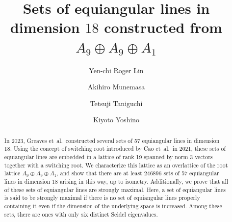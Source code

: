 \documentclass[reqno, 11pt]{amsart}
\author[]{Yen-chi Roger Lin}
\author[]{Akihiro Munemasa}
\author[]{Tetsuji Taniguchi}
\author[]{Kiyoto Yoshino}
\title[Sets of equiangular lines in dimension $18$]{Sets of equiangular lines in dimension $18$ constructed from $A_9 \oplus A_9 \oplus A_1$}
\numberwithin{equation}{section}
\theoremstyle{definition}
\begin{document}
\begin{abstract}
	In 2023, Greaves et~al.\ constructed several sets of 57 equiangular lines in dimension 18.
	Using the concept of switching root introduced by Cao et~al.\ in 2021, these sets of equiangular lines are embedded in a lattice of rank 19 spanned by norm 3 vectors together with a switching root.
	We characterize this lattice as an overlattice of the root lattice $A_9\oplus A_9\oplus A_1$, and show that there are at least $246896$ sets of 57 equiangular lines in dimension $18$ arising in this way, up to isometry.
	Additionally, we prove that all of these sets of equiangular lines are strongly maximal.
	Here, a set of equiangular lines is said to be strongly maximal if there is no set of equiangular lines properly containing it even if the dimension of the underlying space is increased.
	Among these sets, there are ones with only six distinct Seidel eigenvalues.
\end{abstract}
\maketitle

\end{document}
